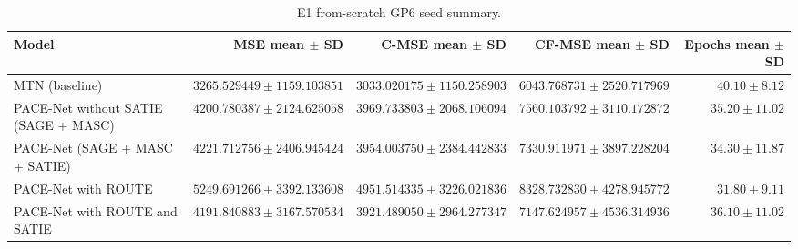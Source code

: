 \begin{table}[t]
\centering
\small
\begin{tabular}{lrrrr}
\hline
Model & MSE mean $\pm$ SD & C-MSE mean $\pm$ SD & CF-MSE mean $\pm$ SD & Epochs mean $\pm$ SD \\
\hline
MTN (baseline) & $3265.529449 \pm 1159.103851$ & $3033.020175 \pm 1150.258903$ & $6043.768731 \pm 2520.717969$ & $40.10 \pm 8.12$ \\
PACE-Net without SATIE (SAGE + MASC) & $4200.780387 \pm 2124.625058$ & $3969.733803 \pm 2068.106094$ & $7560.103792 \pm 3110.172872$ & $35.20 \pm 11.02$ \\
PACE-Net (SAGE + MASC + SATIE) & $4221.712756 \pm 2406.945424$ & $3954.003750 \pm 2384.442833$ & $7330.911971 \pm 3897.228204$ & $34.30 \pm 11.87$ \\
PACE-Net with ROUTE & $5249.691266 \pm 3392.133608$ & $4951.514335 \pm 3226.021836$ & $8328.732830 \pm 4278.945772$ & $31.80 \pm 9.11$ \\
PACE-Net with ROUTE and SATIE & $4191.840883 \pm 3167.570534$ & $3921.489050 \pm 2964.277347$ & $7147.624957 \pm 4536.314936$ & $36.10 \pm 11.02$ \\
\hline
\end{tabular}
\caption{E1 from-scratch GP6 seed summary.}
\end{table}
